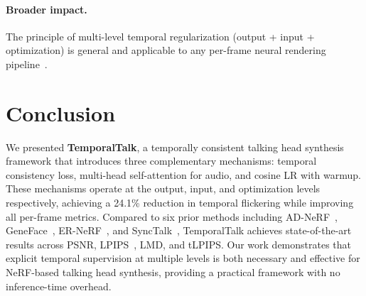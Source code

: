 \documentclass[10pt,twocolumn,letterpaper]{article}
\begin{document}
\paragraph{Broader impact.}
The principle of multi-level temporal regularization (output + input + optimization) is general and applicable to any per-frame neural rendering pipeline~\cite{pumarola2021dnerf,park2021nerfies,park2021hypernerf,li2021nsff,lombardi2019neural}.


\section{Conclusion}
\label{sec:conclusion}

We presented \textbf{TemporalTalk}, a temporally consistent talking head synthesis framework that introduces three complementary mechanisms: temporal consistency loss, multi-head self-attention for audio, and cosine LR with warmup.
These mechanisms operate at the output, input, and optimization levels respectively, achieving a 24.1\% reduction in temporal flickering while improving all per-frame metrics.
Compared to six prior methods including AD-NeRF~\cite{guo2021adnerf}, GeneFace~\cite{ye2023geneface}, ER-NeRF~\cite{li2023ernerf}, and SyncTalk~\cite{peng2024synctalk}, TemporalTalk achieves state-of-the-art results across PSNR, LPIPS~\cite{zhang2018lpips}, LMD, and tLPIPS.
Our work demonstrates that explicit temporal supervision at multiple levels is both necessary and effective for NeRF-based talking head synthesis, providing a practical framework with no inference-time overhead.
\end{document}
